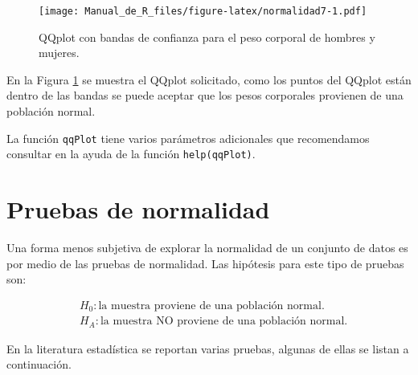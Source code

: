 \documentclass[10pt,]{krantz}
\makeatletter
\newenvironment{Shaded}{\begin{snugshade}}{\end{snugshade}}
\newcommand{\KeywordTok}[1]{\textcolor[rgb]{0.13,0.29,0.53}{\textbf{{#1}}}}
\newcommand{\DataTypeTok}[1]{\textcolor[rgb]{0.13,0.29,0.53}{{#1}}}
\newcommand{\DecValTok}[1]{\textcolor[rgb]{0.00,0.00,0.81}{{#1}}}
\newcommand{\StringTok}[1]{\textcolor[rgb]{0.31,0.60,0.02}{{#1}}}
\newcommand{\NormalTok}[1]{{#1}}
\newenvironment{kframe}{%
\medskip{}
\setlength{\fboxsep}{.8em}
 \def\at@end@of@kframe{}%
 \ifinner\ifhmode%
  \def\at@end@of@kframe{\end{minipage}}%
  \begin{minipage}{\columnwidth}%
 \fi\fi%
 \def\FrameCommand##1{\hskip\@totalleftmargin \hskip-\fboxsep
 \colorbox{shadecolor}{##1}\hskip-\fboxsep
     \hskip-\linewidth \hskip-\@totalleftmargin \hskip\columnwidth}%
 \MakeFramed {\advance\hsize-\width
   \@totalleftmargin\z@ \linewidth\hsize
   \@setminipage}}%
 {\par\unskip\endMakeFramed%
 \at@end@of@kframe}
\renewenvironment{Shaded}{\begin{kframe}}{\end{kframe}}
\makeatother
\begin{document}
\begin{Shaded}
\end{Shaded}

\begin{figure}[htbp]
\centering
\texttt{[image: Manual\_de\_R\_files/figure-latex/normalidad7-1.pdf]}
\caption{\label{fig:normalidad7}QQplot con bandas de confianza para el peso
corporal de hombres y mujeres.}
\end{figure}

En la Figura \ref{fig:normalidad7} se muestra el QQplot solicitado, como
los puntos del QQplot están dentro de las bandas se puede aceptar que
los pesos corporales provienen de una población normal.

La función \texttt{qqPlot} tiene varios parámetros adicionales que
recomendamos consultar en la ayuda de la función \texttt{help(qqPlot)}.

\section{Pruebas de normalidad}\label{pruebas-de-normalidad}

Una forma menos subjetiva de explorar la normalidad de un conjunto de
datos es por medio de las pruebas de normalidad. Las hipótesis para este
tipo de pruebas son:

\begin{equation}
\begin{split}
&H_0: \text{la muestra proviene de una población normal.} \\
&H_A: \text{la muestra NO proviene de una población normal.}
\end{split}
\end{equation}

En la literatura estadística se reportan varias pruebas, algunas de
ellas se listan a continuación.
\end{document}
